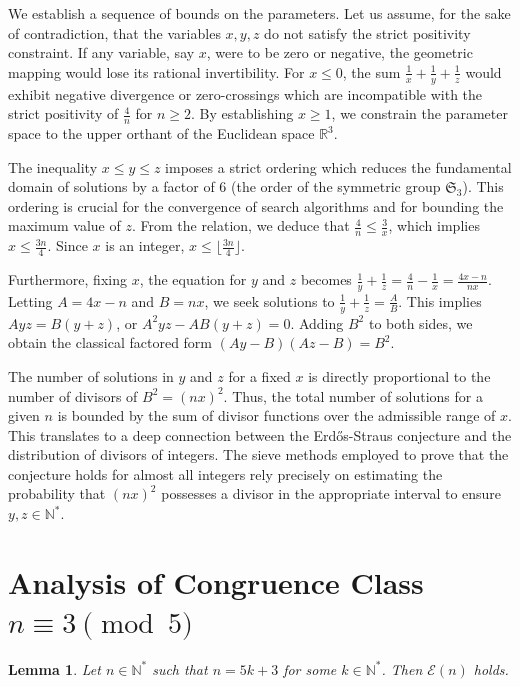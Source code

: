 \documentclass[12pt, a4paper]{article}
\newtheorem{lemma}[theorem]{Lemma}
\theoremstyle{definition}
\theoremstyle{remark}
\begin{document}
We establish a sequence of bounds on the parameters. Let us assume, for the sake of contradiction, that the variables $x, y, z$ do not satisfy the strict positivity constraint. If any variable, say $x$, were to be zero or negative, the geometric mapping would lose its rational invertibility. For $x \le 0$, the sum $\frac{1}{x} + \frac{1}{y} + \frac{1}{z}$ would exhibit negative divergence or zero-crossings which are incompatible with the strict positivity of $\frac{4}{n}$ for $n \ge 2$. By establishing $x \ge 1$, we constrain the parameter space to the upper orthant of the Euclidean space $\mathbb{R}^3$.

The inequality $x \le y \le z$ imposes a strict ordering which reduces the fundamental domain of solutions by a factor of 6 (the order of the symmetric group $\mathfrak{S}_3$). This ordering is crucial for the convergence of search algorithms and for bounding the maximum value of $z$. From the relation, we deduce that $\frac{4}{n} \le \frac{3}{x}$, which implies $x \le \frac{3n}{4}$. Since $x$ is an integer, $x \le \lfloor \frac{3n}{4} \rfloor$.

Furthermore, fixing $x$, the equation for $y$ and $z$ becomes $\frac{1}{y} + \frac{1}{z} = \frac{4}{n} - \frac{1}{x} = \frac{4x - n}{nx}$. Letting $A = 4x - n$ and $B = nx$, we seek solutions to $\frac{1}{y} + \frac{1}{z} = \frac{A}{B}$. This implies $Ayz = B(y+z)$, or $A^2 y z - AB(y+z) = 0$. Adding $B^2$ to both sides, we obtain the classical factored form $(Ay - B)(Az - B) = B^2$.

The number of solutions in $y$ and $z$ for a fixed $x$ is directly proportional to the number of divisors of $B^2 = (nx)^2$. Thus, the total number of solutions for a given $n$ is bounded by the sum of divisor functions over the admissible range of $x$. This translates to a deep connection between the Erd\H{o}s-Straus conjecture and the distribution of divisors of integers. The sieve methods employed to prove that the conjecture holds for almost all integers rely precisely on estimating the probability that $(nx)^2$ possesses a divisor in the appropriate interval to ensure $y, z \in \mathbb{N}^*$.

\section{Analysis of Congruence Class $n \equiv 3 \pmod 5$}

\begin{lemma}
Let $n \in \mathbb{N}^*$ such that $n = 5k + 3$ for some $k \in \mathbb{N}^*$. Then $\mathcal{E}(n)$ holds.
\end{lemma}
\end{document}
